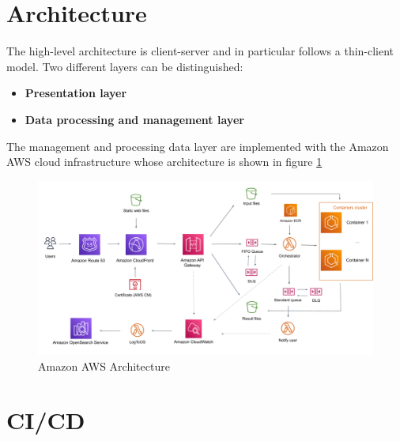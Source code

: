 \documentclass[a4paper,10pt, titlepage]{article}
\begin{document}
\section{Architecture}
The high-level architecture is client-server and in particular follows a thin-client model. 
Two different layers can be distinguished:
\begin{itemize}
	\item \textbf{Presentation layer}
	\item \textbf{Data processing and management layer}
\end{itemize}
The management and processing data layer are implemented with the Amazon AWS cloud infrastructure whose architecture is shown in figure \ref{fig:arch}
\begin{figure}[H]
	\centering
	\includegraphics[width=\linewidth]{figures/arch.png}
	\caption{Amazon AWS Architecture}
	\label{fig:arch}
\end{figure}
\section{CI/CD}
\end{document}
